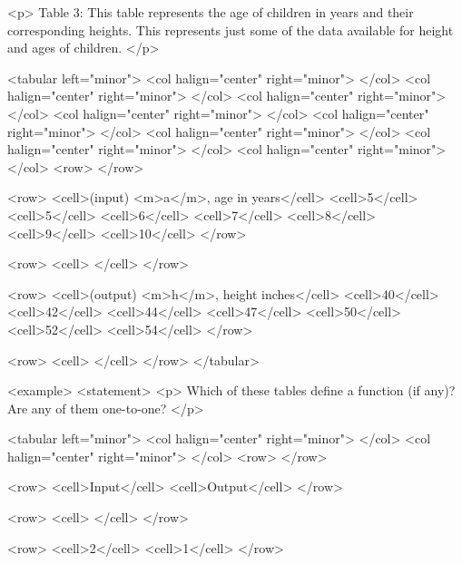         <p>
            Table 3: This table represents the age of children in years and their corresponding heights.
            This represents just some of the data available for height and ages of children.
        </p>

        <tabular left="minor">
            <col halign="center" right="minor"> </col> <col halign="center" right="minor"> </col> <col halign="center" right="minor"> </col> <col halign="center" right="minor"> </col> <col halign="center" right="minor"> </col> <col halign="center" right="minor"> </col> <col halign="center" right="minor"> </col> <col halign="center" right="minor"> </col>
            <row>
            </row>

            <row>
                <cell>(input) <m>a</m>, age in years</cell>
                <cell>5</cell>
                <cell>5</cell>
                <cell>6</cell>
                <cell>7</cell>
                <cell>8</cell>
                <cell>9</cell>
                <cell>10</cell>
            </row>

            <row>
                <cell> </cell>
            </row>

            <row>
                <cell>(output) <m>h</m>, height inches</cell>
                <cell>40</cell>
                <cell>42</cell>
                <cell>44</cell>
                <cell>47</cell>
                <cell>50</cell>
                <cell>52</cell>
                <cell>54</cell>
            </row>

            <row>
                <cell> </cell>
            </row>
        </tabular>

        <example>
            <statement>
                <p>
                    Which of these tables define a function (if any)? Are any of them one-to-one?
                </p>

                <tabular left="minor">
                    <col halign="center" right="minor"> </col> <col halign="center" right="minor"> </col>
                    <row>
                    </row>

                    <row>
                        <cell>Input</cell>
                        <cell>Output</cell>
                    </row>

                    <row>
                        <cell> </cell>
                    </row>

                    <row>
                        <cell>2</cell>
                        <cell>1</cell>
                    </row>


